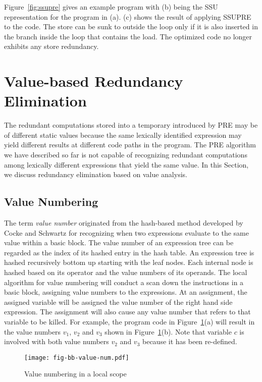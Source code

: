 Figure~\ref{fig:ssupre} gives an example program with (b) being the SSU 
representation for the program in (a).  
(c) shows the result of applying SSUPRE to the code.
The store can be sunk to outside the loop only if it is also inserted in
the branch inside the loop that contains the load.  The optimized code no
longer exhibits any store redundancy.

\section{Value-based Redundancy Elimination}
\label{section:Part3:Pre_not_helped:SemanticPRE}

The redundant computations stored into a temporary introduced by PRE may
be of different static values because the same lexically identified expression 
may yield different results at different code paths in the program.
The PRE algorithm we have described so far is not capable
of recognizing redundant computations among lexically different expressions
that yield the same value.  In this Section, we discuss redundancy elimination
based on value analysis.

\subsection{Value Numbering}
\label{sec:pre_not_helped:GVN}
The term \emph{value number} originated from the 
hash-based method developed by Cocke and Schwartz for recognizing when two
expressions evaluate to the same value within a basic block.  
The value number of an expression tree can be regarded as the index of its
hashed entry in the hash table.  
An expression tree is hashed recursively bottom up starting with the leaf nodes.
Each internal node is hashed based on its operator and the value numbers of 
its operands.  The local algorithm for value numbering will conduct a scan
down the instructions in a basic block, assigning value numbers to the
expressions.  At an assignment, the assigned variable will be assigned
the value number of the right hand side expression.  The assignment will also
cause any value number that refers to that variable to be killed. For example,
the program code in Figure~\ref{fig:bb-value-num}(a) will result in the
value numbers $v_1$, $v_2$ and $v_3$ shown in Figure~\ref{fig:bb-value-num}(b).
Note that variable $c$ is involved with both value numbers $v_2$ and $v_3$
because it has been re-defined.

\begin{figure}[t]
\centering
\texttt{[image: fig-bb-value-num.pdf]}
\caption{Value numbering in a local scope}
\label{fig:bb-value-num}
\end{figure}


